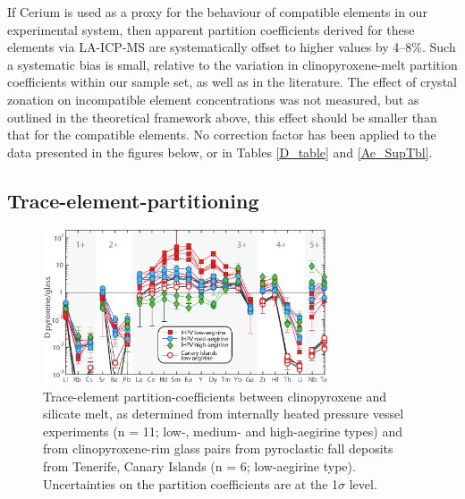 \documentclass[final,authoryear,3p,times,twocolumn]{elsarticle}
\begin{document}
If Cerium is used as a proxy for the behaviour of compatible elements in our experimental system, then apparent partition coefficients derived for these elements via LA-ICP-MS are systematically offset to higher values by 4--8\%. Such a systematic bias is small, relative to the variation in clinopyroxene-melt partition coefficients within our sample set, as well as in the literature. The effect of crystal zonation on incompatible element concentrations was not measured, but as outlined in the theoretical framework above, this effect should be smaller than that for the compatible elements. No correction factor has been applied to the data presented in the figures below, or in Tables \ref{D_table} and \ref{Ae_SupTbl}. 

\subsection{Trace-element-partitioning}

        \begin{figure}[tb]
        \begin{center}
        \includegraphics[width=0.75\textwidth]{6_Px_D_Spider_Apr2018.eps}
        \caption[Extended trace-element-partitioning diagram for clinopyroxene/melt]{Trace-element partition-coefficients between clinopyroxene and silicate melt, as determined from internally heated pressure vessel experiments (n = 11; low-, medium- and high-aegirine types) and from clinopyroxene-rim glass pairs from pyroclastic fall deposits from Tenerife, Canary Islands (n = 6; low-aegirine type). Uncertainties on the partition coefficients are at the 1$\sigma$ level.}
        \label{6_D_Spider}
        \end{center}
        \end{figure}
\end{document}

